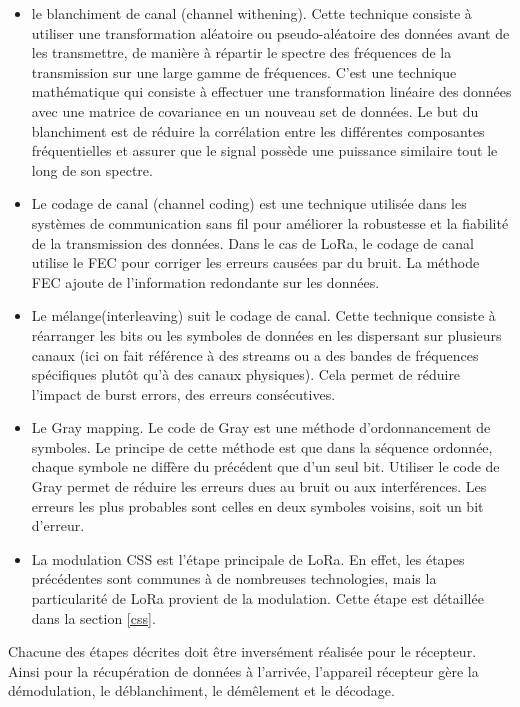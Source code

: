 \begin{itemize}
\item le blanchiment de canal (channel withening).
Cette technique consiste à utiliser une transformation aléatoire ou pseudo-aléatoire des données avant de les transmettre, de manière à répartir le spectre des fréquences de la transmission sur une large gamme de fréquences. C'est une technique mathématique qui consiste à effectuer une transformation linéaire des données avec une matrice de covariance en un nouveau set de données. Le but du blanchiment est de réduire la corrélation entre les différentes composantes fréquentielles et assurer que le signal possède une puissance similaire tout le long de son spectre.
\item Le codage de canal (channel coding) est une technique utilisée dans les systèmes de communication sans fil pour améliorer la robustesse et la fiabilité de la transmission des données. Dans le cas de LoRa, le codage de canal utilise le \ac{FEC} pour corriger les erreurs causées par du bruit. La méthode FEC ajoute de l'information redondante sur les données.
\item Le mélange(interleaving) suit le codage de canal.  
Cette technique consiste à réarranger les bits ou les symboles de données en les dispersant sur plusieurs canaux (ici on fait référence à des streams ou a des bandes de fréquences spécifiques plutôt qu'à des canaux physiques). Cela permet de réduire l'impact de burst errors, des erreurs consécutives.
\item Le Gray mapping. Le code de Gray est une méthode d'ordonnancement de symboles. Le principe de cette méthode est que dans la séquence ordonnée, chaque symbole ne diffère du précédent que d'un seul bit. Utiliser le code de Gray permet de réduire les erreurs dues au bruit ou aux interférences. Les erreurs les plus probables sont celles en deux symboles voisins, soit un bit d'erreur.
\item La modulation \ac{CSS} est l'étape principale de LoRa. En effet, les étapes précédentes sont communes à de nombreuses technologies, mais la particularité de LoRa provient de la modulation. Cette étape est détaillée dans la section \ref{css}.
\end{itemize}

\vspace{0.1cm}

Chacune des étapes décrites doit être inversément réalisée pour le récepteur. Ainsi pour la récupération de données à l'arrivée, l'appareil récepteur gère la démo\-dulation, le déblanchiment, le démêlement et le décodage.

